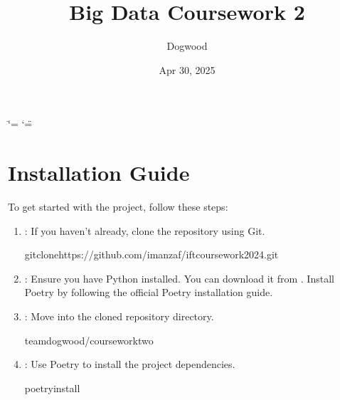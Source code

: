 \documentclass[letterpaper,10pt,english]{sphinxmanual}
\title{Big Data \sphinxhyphen{} Coursework 2}
\date{Apr 30, 2025}
\author{Dogwood}
\begin{document}
\ifdefined\shorthandoff
  \ifnum\catcode`\=\string=\active\shorthandoff{=}\fi
  \ifnum\catcode`\"=\active{}\fi
\fi

\pagestyle{empty}
\sphinxmaketitle
\pagestyle{plain}
\sphinxtableofcontents
\pagestyle{normal}
\label{\detokenize{index::doc}}


\sphinxstepscope


\chapter{Installation Guide}
\label{\detokenize{installation:installation-guide}}\label{\detokenize{installation::doc}}
\sphinxAtStartPar
To get started with the project, follow these steps:
\begin{enumerate}
%
\item {} 
\sphinxAtStartPar
{}: If you haven’t already, clone the repository using Git.

\begin{sphinxVerbatim}[commandchars=\\\{\}]
gitclonehttps://github.com/imanzaf/ift\PYGZus{}coursework\PYGZus{}2024.git
\end{sphinxVerbatim}

\item {} 
\sphinxAtStartPar
{}:
\sphinxhyphen{} Ensure you have Python installed. You can download it from .
\sphinxhyphen{} Install Poetry by following the official Poetry installation guide.

\item {} 
\sphinxAtStartPar
{}: Move into the cloned repository directory.

\begin{sphinxVerbatim}[commandchars=\\\{\}]
team\PYGZus{}dogwood/coursework\PYGZus{}two
\end{sphinxVerbatim}

\item {} 
\sphinxAtStartPar
{}: Use Poetry to install the project dependencies.

\begin{sphinxVerbatim}[commandchars=\\\{\}]
poetryinstall
\end{sphinxVerbatim}


\end{enumerate}
\end{document}
